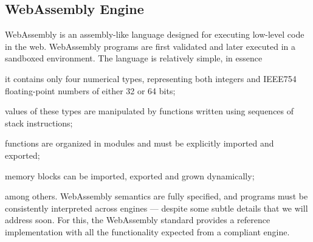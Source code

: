 \documentclass[sigconf,review,anonymous]{acmart}
\begin{document}
\subsection{WebAssembly Engine}

WebAssembly \cite{haas2017bringing} is an assembly-like language designed for
executing low-level code in the web.
%
WebAssembly programs are first validated
%
%
and later executed in a sandboxed environment.
%
%
The language is relatively simple, in essence
%
\begin{inparaenum}
  \item it contains only four numerical types, representing both integers and
    IEEE754 floating-point numbers of either 32 or 64 bits;
  \item values of these types are manipulated by functions written using
    sequences of stack instructions;
  \item functions are organized in modules and must be explicitly imported and
    exported;
  \item memory blocks can be imported, exported and grown dynamically;
\end{inparaenum}
%
among others.
%
%
WebAssembly semantics are fully specified, and programs must be consistently
interpreted across engines --- despite some subtle details that we will address
soon.
%
For this, the WebAssembly standard provides a reference implementation with all
the functionality expected from a compliant engine.
%
\end{document}
